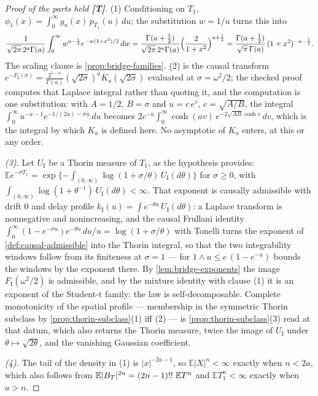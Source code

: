 \begin{proof}[Proof of the parts held \textbf{[T]}]
(1) Conditioning on $T_1$, $\phi_1(x) = \int_0^\infty g_u(x)\,p_{T_1}(u)\,du$; the substitution
$w = 1/u$ turns this into
\[
  \frac{1}{\sqrt{2\pi}\,2^a\Gamma(a)}\int_0^\infty w^{a-\frac12}e^{-w(1+x^2)/2}\,dw
  = \frac{\Gamma(a+\frac12)}{\sqrt{2\pi}\,2^a\Gamma(a)}\Bigl(\frac{2}{1+x^2}\Bigr)^{a+\frac12}
  = \frac{\Gamma(a+\frac12)}{\sqrt\pi\,\Gamma(a)}\,(1+x^2)^{-a-\frac12}.
\]
The scaling clause is \ref{prop:bridge-families}. (2) is the causal transform
$e^{-F_{\mathrm I}(\sigma)} = \frac{2^{1-a}}{\Gamma(a)}(\sqrt{2\sigma})^aK_a(\sqrt{2\sigma})$
evaluated at $\sigma = \omega^2/2$; the checked proof computes that Laplace integral rather than
quoting it, and the computation is one substitution: with $A = 1/2$, $B = \sigma$ and
$u = c\,e^{v}$, $c = \sqrt{A/B}$, the integral
$\int_0^\infty u^{-a-1}e^{-1/(2u) - \sigma u}\,du$ becomes
$2c^{-a}\int_0^\infty\cosh(av)\,e^{-2\sqrt{AB}\cosh v}\,dv$, which is the integral by which
$K_a$ is defined here. No asymptotic of $K_a$ enters, at this or any order.

\emph{(3).} Let $U_{\mathrm I}$ be a Thorin measure of $T_1$, as the hypothesis provides:
$\mathbb{E}e^{-\sigma T_1}
= \exp\{-\int_{(0,\infty)}\log(1 + \sigma/\theta)\,U_{\mathrm I}(d\theta)\}$ for $\sigma \ge 0$,
with $\int_{(0,\infty)}\log(1 + \theta^{-1})\,U_{\mathrm I}(d\theta) < \infty$. That exponent is
causally admissible with drift $0$ and delay profile
$k_{\mathrm I}(u) = \int e^{-\theta u}\,U_{\mathrm I}(d\theta)$: a Laplace transform is
nonnegative and nonincreasing, and the causal Frullani identity
$\int_0^\infty(1 - e^{-\sigma u})e^{-\theta u}\,du/u = \log(1 + \sigma/\theta)$ with Tonelli
turns the exponent of \ref{def:causal-admissible} into the Thorin integral, so that the two
integrability windows follow from its finiteness at $\sigma = 1$ --- for $1 \wedge u \le
e\,(1 - e^{-u})$ bounds the windows by the exponent there. By \ref{lem:bridge-exponents} the
image $F_{\mathrm I}(\omega^2/2)$ is admissible, and by the mixture identity with clause (1) it
is an exponent of the Student-t family: the law is self-decomposable. Complete monotonicity of
the spatial profile --- membership in the symmetric Thorin subclass by
\ref{prop:thorin-subclass}(1) iff (2) --- is \ref{prop:thorin-subclass}(3) read at that datum,
which also returns the Thorin measure, twice the image of $U_{\mathrm I}$ under
$\theta \mapsto \sqrt{2\theta}$, and the vanishing Gaussian coefficient.

\emph{(4).} The
tail of the density in (1) is $|x|^{-2a-1}$, so $\mathbb{E}|X|^n < \infty$ exactly when
$n < 2a$, which also follows from $\mathbb{E}|B_T|^{2n} = (2n-1)!!\;\mathbb{E}T^n$ and
$\mathbb{E}T_1^n < \infty$ exactly when $a > n$.
\end{proof}

